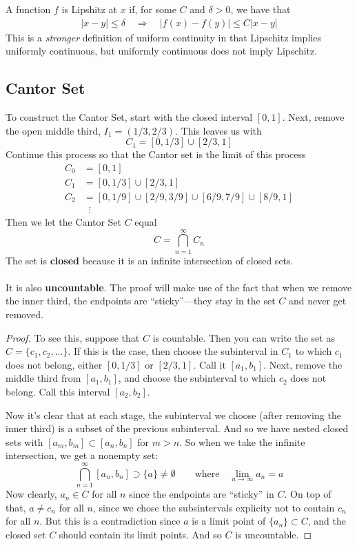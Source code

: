 \documentclass[12pt]{article}
\theoremstyle{plain}
\theoremstyle{definition}
\theoremstyle{remark}
\begin{document}
A function $f$ is Lipshitz at $x$ if, for some $C$ and $\delta>0$, we have that 
\begin{align*}
    |x-y|\leq \delta \quad \Rightarrow \quad 
        |f(x) - f(y)|\leq C|x-y|
\end{align*}
This is a \emph{stronger} definition of uniform continuity in that Lipschitz implies uniformly continuous, but uniformly continuous does not imply Lipschitz.

\subsection{Cantor Set}

To construct the Cantor Set, start with the closed interval $[0,1]$. Next, remove the open middle third, $I_1 = (1/3, 2/3)$. This leaves us with 
    \[ C_1 = [0, 1/3] \cup [2/3, 1] \]
Continue this process so that the Cantor set is the limit of this process
\begin{align*}
    C_0 &= [0,1] \\
    C_1 &= [0,1/3] \cup [2/3, 1] \\
    C_2 &= [0,1/9] \cup [2/9, 3/9]  \cup [6/9, 7/9] \cup [8/9, 1]
        \\
    &\;\;\vdots 
\end{align*}
Then we let the Cantor Set $C$ equal
    \[ C = \bigcap^\infty_{n=1} C_n \]
    The set is \textbf{closed} because it is an infinite intersection of closed sets.
\\
\\
It is also \textbf{uncountable}. The proof will make use of the fact that when we remove the inner third, the endpoints are ``sticky''---they stay in the set $C$ and never get removed.
\begin{proof}
To see this, suppose that $C$ is countable. Then you can write the set as $C = \{c_1, c_2, \ldots\}$. If this is the case, then choose the subinterval in $C_1$ to which $c_1$ does not belong, either $[0,1/3]$ or $[2/3,1]$. Call it $[a_1, b_1]$. Next, remove the middle third from $[a_1, b_1]$, and choose the subinterval to which $c_2$ does not belong. Call this interval $[a_2, b_2]$. 

Now it's clear that at each stage, the subinterval we choose (after removing the inner third) is a subset of the previous subinterval. And so we have nested closed sets with $[a_m, b_m] \subset [a_n, b_n]$ for $m>n$. So when we take the infinite intersection, we get a nonempty set:
\[ 
    \bigcap^\infty_{n=1} [a_n, b_n] \supset \{a\} \neq 
    \emptyset\qquad \text{where} \quad 
    \lim_{n\rightarrow\infty} a_n = a
\]
Now clearly, $a_n\in C$ for all $n$ since the endpoints are ``sticky'' in $C$.  On top of that, $a\neq c_n$ for all $n$, since we chose the subsintervals explicity not to contain $c_n$ for all $n$.  But this is a contradiction since $a$ is a limit point of $\{a_n\}\subset C$, and the closed set $C$ should contain its limit points. And so $C$ is uncountable.
\end{proof}
\end{document}
